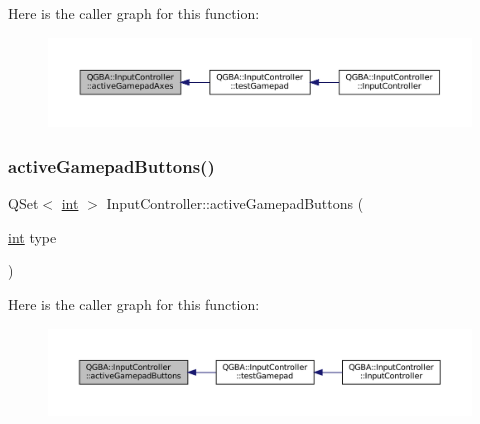 Here is the caller graph for this function\+:
\nopagebreak
\begin{figure}[H]
\begin{center}
\leavevmode
\includegraphics[width=350pt]{class_q_g_b_a_1_1_input_controller_a05dfd816f7f197068514b2065bbefef9_icgraph}
\end{center}
\end{figure}
\mbox{\label{class_q_g_b_a_1_1_input_controller_af63517975e1ed30b033474060da4d9b1}} 
\subsubsection{\texorpdfstring{active\+Gamepad\+Buttons()}{activeGamepadButtons()}}
{\footnotesize\ttfamily Q\+Set$<$ \mbox{\hyperlink{ioapi_8h_a787fa3cf048117ba7123753c1e74fcd6}{int}} $>$ Input\+Controller\+::active\+Gamepad\+Buttons (\begin{DoxyParamCaption}\item[{\mbox{\hyperlink{ioapi_8h_a787fa3cf048117ba7123753c1e74fcd6}{int}}}]{type }\end{DoxyParamCaption})}

Here is the caller graph for this function\+:
\nopagebreak
\begin{figure}[H]
\begin{center}
\leavevmode
\includegraphics[width=350pt]{class_q_g_b_a_1_1_input_controller_af63517975e1ed30b033474060da4d9b1_icgraph}
\end{center}
\end{figure}
\mbox{\label{class_q_g_b_a_1_1_input_controller_ae9df370f0ec15e1246859fd24e5da0ee}} 
